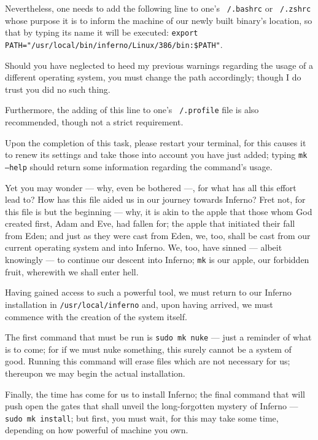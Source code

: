 \documentclass[a4paper,12pt]{report}
\begin{document}
  Nevertheless, one needs to add the following line to one's \texttt{~/.bashrc} or \texttt{~/.zshrc} whose purpose it is to inform the machine of our newly built binary's location, so that by typing its name it will be executed: \texttt{export PATH="/usr/local/bin/inferno/Linux/386/bin:\$PATH"}.

  Should you have neglected to heed my previous warnings regarding the usage of a different operating system, you must change the path accordingly; though I do trust you did no such thing.

  Furthermore, the adding of this line to one's \texttt{~/.profile} file is also recommended, though not a strict requirement.

  Upon the completion of this task, please restart your terminal, for this causes it to renew its settings and take those into account you have just added; typing \texttt{mk --help} should return some information regarding the command's usage.

  Yet you may wonder — why, even be bothered —, for what has all this effort lead to? How has this file aided us in our journey towards Inferno? Fret not, for this file is but the beginning — why, it is akin to the apple that those whom God created first, Adam and Eve, had fallen for; the apple that initiated their fall from Eden; and just as they were cast from Eden, we, too, shall be cast from our current operating system and into Inferno. We, too, have sinned — albeit knowingly — to continue our descent into Inferno; \texttt{mk} is our apple, our forbidden fruit, wherewith we shall enter hell.

  Having gained access to such a powerful tool, we must return to our Inferno installation in \texttt{/usr/local/inferno} and, upon having arrived, we must commence with the creation of the system itself.

  The first command that must be run is \texttt{sudo mk nuke} — just a reminder of what is to come; for if we must nuke something, this surely cannot be a system of good. Running this command will erase files which are not necessary for us; thereupon we may begin the actual installation.

  Finally, the time has come for us to install Inferno; the final command that will push open the gates that shall unveil the long-forgotten mystery of Inferno — \texttt{sudo mk install}; but first, you must wait, for this may take some time, depending on how powerful of machine you own.
  \newpage

  \thispagestyle{empty}
    \mbox{}
    \newpage
\end{document}
